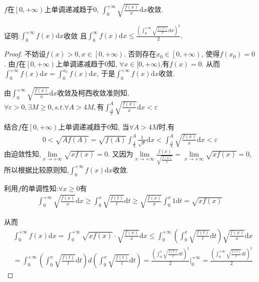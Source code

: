 \documentclass[lang=cn,newtx,10pt,scheme=chinese]{../Template/elegantbook}
\begin{document}
\begin{example}
$f$在$\left[ 0,+\infty \right) $上单调递减趋于0,
$\int_0^{+\infty}{\sqrt{\frac{f(x)}{x}}\mathrm{d}x}$收敛.

证明:$\int_0^{+\infty}{f\left( x \right) \mathrm{d}x}$收敛
且$\int_0^{\infty}{f\left( x \right) \mathrm{d}x}\leqslant \frac{\left( \int_0^{+\infty}{\sqrt{\frac{f\left( x \right)}{x}}\mathrm{d}x} \right) ^2}{2}.$
\begin{proof}
不妨设$f(x)>0,x\in \left[ 0,+\infty \right)$.
否则存在$x_0\in \left[ 0,+\infty \right)$,
使得$f\left( x_0 \right) =0$.
由$f$在$\left[ 0,+\infty \right) $上单调递减趋于0知,
$ \forall x\in [0,+\infty)$,有$f(x)=0$.
从而$\int_0^{+\infty}{f\left( x \right) \mathrm{d}x}=\int_0^{x_0}{f\left( x \right) \mathrm{d}x}$,
于是$\int_0^{+\infty}{f\left( x \right) \mathrm{d}x}$收敛.

由$\int_0^{+\infty}{\sqrt{\frac{f(x)}{x}}\mathrm{d}x}$收敛及柯西收敛准则知,
$\forall \varepsilon>0,\exists M\geqslant 0,s.t. \forall A>4M,\text{有}
\int_{\frac{A}{4}}^A{\sqrt{\frac{f(x)}{x}}\mathrm{d}x}<\varepsilon$

结合$f$在$\left[ 0,+\infty \right) $上单调递减趋于0知,
当$\forall A>4M$时,有
\begin{equation}
\begin{split}
0<\sqrt{Af(A)}=\sqrt{f(A)}\int_{\frac{A}{4}}^A{\frac{1}{\sqrt{x}}\mathrm{d}x<}\int_{\frac{A}{4}}^A{\sqrt{\frac{f(x)}{x}}\mathrm{d}x<}\varepsilon 
\end{split}
\nonumber
\end{equation}
由迫敛性知,$\underset{x\rightarrow +\infty}{\lim}\sqrt{xf(x)}=0$.
又因为$\underset{x\rightarrow +\infty}{\lim}\frac{f(x)}{\sqrt{\frac{f(x)}{x}}}=\underset{x\rightarrow +\infty}{\lim}\sqrt{xf(x)}=0$,
所以根据比较原则知,$\int_0^{+\infty}{f\left( x \right) \mathrm{d}x}$收敛.

利用$f$的单调性知:$\forall x \geqslant 0$有
\begin{equation}
\begin{split}
\int_0^{+\infty}{\sqrt{\frac{f(x)}{x}}\mathrm{d}x}\geqslant \int_0^x{\sqrt{\frac{f(t)}{t}}\mathrm{d}t}\geqslant \sqrt{\frac{f(x)}{x}}\int_0^x{1\mathrm{d}t}=\sqrt{xf\left( x \right)}
\end{split}
\nonumber
\end{equation}

从而
\begin{equation}
\begin{split}
&\int_0^{+\infty}{f\left( x \right) \mathrm{d}x=}\int_0^{+\infty}{\sqrt{xf\left( x \right)}\cdot \sqrt{\frac{f\left( x \right)}{x}}\mathrm{d}x}\leqslant \int_0^{+\infty}{\left( \int_0^x{\sqrt{\frac{f\left( t \right)}{t}}\mathrm{d}t} \right) \sqrt{\frac{f\left( x \right)}{x}}\mathrm{d}x}
\\
&=\int_0^{+\infty}{\left( \int_0^x{\sqrt{\frac{f\left( t \right)}{t}}\mathrm{d}t} \right) d\left( \int_0^x{\sqrt{\frac{f\left( t \right)}{t}}\mathrm{d}t} \right)}=\frac{\left( \int_0^x{\sqrt{\frac{f\left( t \right)}{t}}\mathrm{d}t} \right) ^2}{2}\Bigg|_{0}^{+\infty}=\frac{\left( \int_0^{+\infty}{\sqrt{\frac{f\left( t \right)}{t}}\mathrm{d}t} \right) ^2}{2}
\end{split}
\nonumber
\end{equation}


\end{proof}
\end{example}
\end{document}
